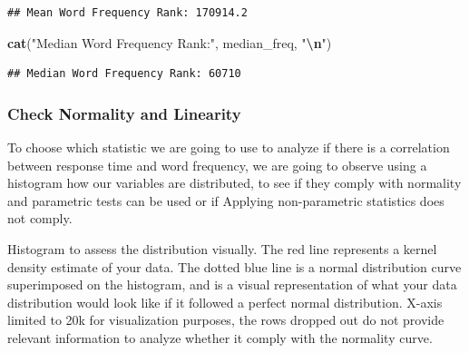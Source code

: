 \documentclass[
]{article}
\newenvironment{Shaded}{\begin{snugshade}}{\end{snugshade}}
\newcommand{\AttributeTok}[1]{\textcolor[rgb]{0.13,0.29,0.53}{#1}}
\newcommand{\CommentTok}[1]{\textcolor[rgb]{0.56,0.35,0.01}{\textit{#1}}}
\newcommand{\ConstantTok}[1]{\textcolor[rgb]{0.56,0.35,0.01}{#1}}
\newcommand{\FunctionTok}[1]{\textcolor[rgb]{0.13,0.29,0.53}{\textbf{#1}}}
\newcommand{\NormalTok}[1]{#1}
\newcommand{\OtherTok}[1]{\textcolor[rgb]{0.56,0.35,0.01}{#1}}
\newcommand{\SpecialCharTok}[1]{\textcolor[rgb]{0.81,0.36,0.00}{\textbf{#1}}}
\newcommand{\StringTok}[1]{\textcolor[rgb]{0.31,0.60,0.02}{#1}}
\begin{document}
\begin{Shaded}
\end{Shaded}

\begin{verbatim}
## Mean Word Frequency Rank: 170914.2
\end{verbatim}

\begin{Shaded}
\begin{Highlighting}[]
\FunctionTok{cat}\NormalTok{(}\StringTok{"Median Word Frequency Rank:"}\NormalTok{, median\_freq, }\StringTok{"}\SpecialCharTok{\textbackslash{}n}\StringTok{"}\NormalTok{)}
\end{Highlighting}
\end{Shaded}

\begin{verbatim}
## Median Word Frequency Rank: 60710
\end{verbatim}

\hypertarget{check-normality-and-linearity}{%
\subsubsection{Check Normality and
Linearity}\label{check-normality-and-linearity}}

To choose which statistic we are going to use to analyze if there is a
correlation between response time and word frequency, we are going to
observe using a histogram how our variables are distributed, to see if
they comply with normality and parametric tests can be used or if
Applying non-parametric statistics does not comply.

Histogram to assess the distribution visually. The red line represents a
kernel density estimate of your data. The dotted blue line is a normal
distribution curve superimposed on the histogram, and is a visual
representation of what your data distribution would look like if it
followed a perfect normal distribution. X-axis limited to 20k for
visualization purposes, the rows dropped out do not provide relevant
information to analyze whether it comply with the normality curve.
\end{document}
